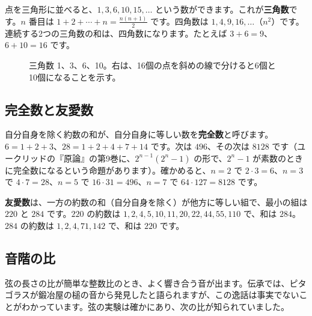 \documentclass[a4paper,11pt,openany]{ltjsbook}
\begin{document}
点を三角形に並べると、$1,3,6,10,15,\ldots$ という数ができます。これが\textbf{三角数}です。$n$ 番目は $1+2+\cdots+n=\tfrac{n(n+1)}{2}$ です。四角数は $1,4,9,16,\ldots$（$n^2$）です。連続する2つの三角数の和は、四角数になります。たとえば $3+6=9$、$6+10=16$ です。

\begin{figure}[htbp]
\centering
{}
\caption{三角数 1、3、6、10。右は、16個の点を斜めの線で分けると6個と10個になることを示す。}
\end{figure}

\subsection{完全数と友愛数}

自分自身を除く約数の和が、自分自身に等しい数を\textbf{完全数}と呼びます。$6=1+2+3$、$28=1+2+4+7+14$ です。次は $496$、その次は $8128$ です（ユークリッドの『原論』の第9巻に、$2^{n-1}(2^n-1)$ の形で、$2^n-1$ が素数のときに完全数になるという命題があります）。確かめると、$n=2$ で $2\cdot3=6$、$n=3$ で $4\cdot7=28$、$n=5$ で $16\cdot31=496$、$n=7$ で $64\cdot127=8128$ です。

\textbf{友愛数}は、一方の約数の和（自分自身を除く）が他方に等しい組で、最小の組は $220$ と $284$ です。$220$ の約数は $1,2,4,5,10,11,20,22,44,55,110$ で、和は $284$。$284$ の約数は $1,2,4,71,142$ で、和は $220$ です。

\subsection{音階の比}

弦の長さの比が簡単な整数比のとき、よく響き合う音が出ます。伝承では、ピタゴラスが鍛冶屋の槌の音から発見したと語られますが、この逸話は事実でないことがわかっています。弦の実験は確かにあり、次の比が知られていました。
\end{document}
